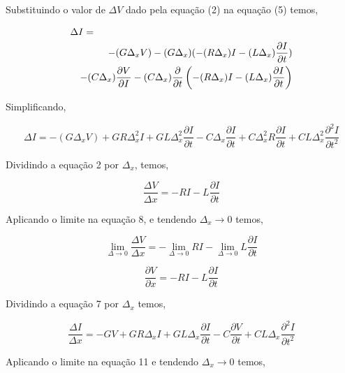 \documentclass[a4paper, 10pt]{article}
\begin{document}

Substituindo o valor de $\Delta V$ dado pela equação (2) na equação (5) temos,

\begin{eqnarray}
\lefteqn{\Delta I=}\nonumber\\ 
& &-(G \Delta_x V)-(G \Delta_x)(-(R \Delta_x)I - (L \Delta_x) \frac{\partial I}{\partial t})\nonumber\\
& &-(C \Delta_x)\frac{\partial V}{\partial I} - (C \Delta_x) \frac{\partial}{\partial t}\left( -(R \Delta_x)I - (L \Delta_x) \frac{\partial I}{\partial t}\right)
\end{eqnarray}

Simplificando,

\begin{equation}
\Delta I = -(G \Delta_x V) + G R \Delta_x^2 I + G L \Delta_x^2 \frac{\partial I}{\partial t} - C \Delta_x \frac{\partial I}{\partial t} + C \Delta_x^2 R \frac{\partial I}{\partial t} + C L \Delta_x^2 \frac{\partial^2 I}{\partial t^2}
\end{equation}

Dividindo a equação 2 por $\Delta_x$, temos,

\begin{equation}
\frac{\Delta V}{\Delta x} = - R I - L \frac{\partial I}{\partial t}
\end{equation}

Aplicando o limite na equação 8, e tendendo $\Delta_x \to 0$ temos,

\begin{equation}
\lim_{\Delta \to 0}\frac{\Delta V}{\Delta x} = - \lim_{\Delta \to 0}{R I} - \lim_{\Delta \to 0}{L \frac{ \partial I}{\partial t}}
\end{equation}

\begin{equation}
\frac{\partial V}{\partial x} = - R I - L \frac{\partial I}{\partial t}
\end{equation}

Dividindo a equação 7 por $\Delta_x$ temos,

\begin{equation}
\frac{\Delta I}{\Delta x} = -G V + G R \Delta_x I + G L \Delta_x \frac{\partial I}{\partial t} - C \frac{\partial V}{\partial t} + C L \Delta_x \frac{\partial^2 I}{\partial t^2}
\end{equation}


Aplicando o limite na equação 11 e tendendo $\Delta_x \to 0$ temos,
\end{document}
